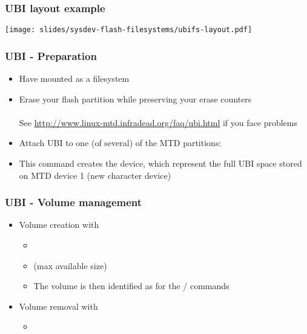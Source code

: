 \begin{frame}
  \frametitle{UBI layout example}
  \begin{center}
    \texttt{[image: slides/sysdev-flash-filesystems/ubifs-layout.pdf]}
  \end{center}
\end{frame}

\begin{frame}
  \frametitle{UBI - Preparation}
  \begin{itemize}
  \item Have  mounted as a  filesystem
  \item Erase your flash partition while preserving your erase counters\\
    \\
    See \url{http://www.linux-mtd.infradead.org/faq/ubi.html} if you
    face problems
  \item Attach UBI to one (of several) of the MTD partitions:\\
  \item This command creates the  device, which represent
    the full UBI space stored on MTD device 1 (new 
    character device)
  \end{itemize}
\end{frame}

\begin{frame}
  \frametitle{UBI - Volume management}
  \begin{itemize}
  \item Volume creation with 
    \begin{itemize}
    \item {}
    \item {} (max available size)
    \item The volume is then identified as  for the
      / commands
    \end{itemize}
  \item Volume removal with 
    \begin{itemize}
    \item {}
    \end{itemize}
  \end{itemize}
\end{frame}

